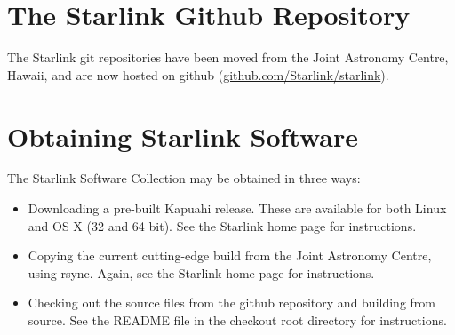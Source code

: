 \section{The Starlink Github Repository}
The Starlink git repositories have been moved from the Joint Astronomy
Centre, Hawaii, and are now hosted on github
(\url{github.com/Starlink/starlink}).

\section{Obtaining Starlink Software}
The Starlink Software Collection may be obtained in three ways:
\begin{itemize}
\item Downloading a pre-built Kapuahi release. These are available for both Linux and OS X (32 and 64 bit). See the Starlink home page for instructions.
\item Copying the current cutting-edge build from the Joint Astronomy Centre, using rsync. Again, see the Starlink home page for instructions.
\item Checking out the source files from the github repository and building from source. See the README file in the checkout root directory for instructions.
\end{itemize}



